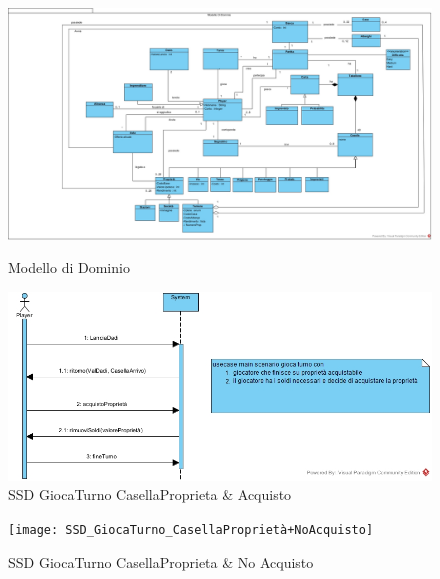 \documentclass{article}
\begin{document}
		\begin{figure}[H]
	\centering
\href{https://github.com/UnimibSoftEngCourse2022/progetto-monopoly-1-gangoffour2/blob/feat/doc/doc/img/ModelloDiDominio.jpg?raw=true}
	{\includegraphics[width=\textwidth]{ModelloDiDominio}}
		\caption{Modello di Dominio}
	\end{figure}

		\begin{figure}[H]
	\centering
\includegraphics[width=\textwidth]{SSD_GiocaTurno_CasellaProprieta+Acquisto}
		\caption{SSD GiocaTurno CasellaProprieta \& Acquisto}
	\end{figure}
	
	
		\begin{figure}[H]
	\centering
\texttt{[image: SSD\_GiocaTurno\_CasellaProprietà+NoAcquisto]}
		\caption{SSD GiocaTurno CasellaProprieta \& No Acquisto}
	\end{figure}
\end{document}
